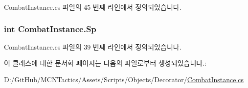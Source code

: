 Combat\+Instance.\+cs 파일의 45 번째 라인에서 정의되었습니다.

\subsubsection[{\texorpdfstring{Sp}{Sp}}]{\setlength{\rightskip}{0pt plus 5cm}int Combat\+Instance.\+Sp\hspace{0.3cm}{\ttfamily [get]}}\hypertarget{class_combat_instance_a120995296719b1fb1fa4cc55721ddba4}{}\label{class_combat_instance_a120995296719b1fb1fa4cc55721ddba4}


Combat\+Instance.\+cs 파일의 39 번째 라인에서 정의되었습니다.



이 클래스에 대한 문서화 페이지는 다음의 파일로부터 생성되었습니다.\+:\begin{DoxyCompactItemize}
\item 
D\+:/\+Git\+Hub/\+M\+C\+N\+Tactics/\+Assets/\+Scripts/\+Objects/\+Decorator/\hyperlink{_combat_instance_8cs}{Combat\+Instance.\+cs}\end{DoxyCompactItemize}
